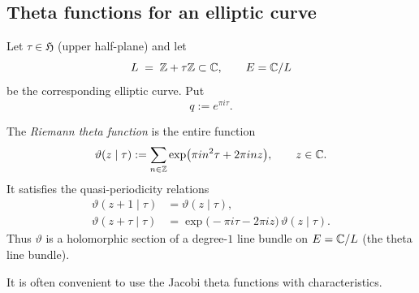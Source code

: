 \documentclass[12pt]{article}
\begin{document}
\subsection{Theta functions for an elliptic curve}

Let $\tau\in\mathfrak{H}$ (upper half-plane) and let
\[
L \;=\; \mathbb{Z} + \tau\mathbb{Z} \subset \mathbb{C}, \qquad
E = \mathbb{C}/L
\]
be the corresponding elliptic curve. Put
\[
q := e^{\pi i\tau}.
\]

\begin{definition}
The \emph{Riemann theta function} is the entire function
\[
\vartheta(z\mid\tau)
:= \sum_{n\in\mathbb{Z}}
   \exp\bigl(\pi i n^2\tau + 2\pi i n z\bigr),
\qquad z\in\mathbb{C}.
\]
It satisfies the quasi-periodicity relations
\begin{align*}
\vartheta(z+1\mid\tau) &= \vartheta(z\mid\tau),\\
\vartheta(z+\tau\mid\tau)
&= \exp\bigl(-\pi i\tau - 2\pi i z\bigr)\,\vartheta(z\mid\tau).
\end{align*}
Thus $\vartheta$ is a holomorphic section of a degree-$1$ line bundle on $E=\mathbb{C}/L$ (the theta line bundle).
\end{definition}

It is often convenient to use the Jacobi theta functions with characteristics.
\end{document}
